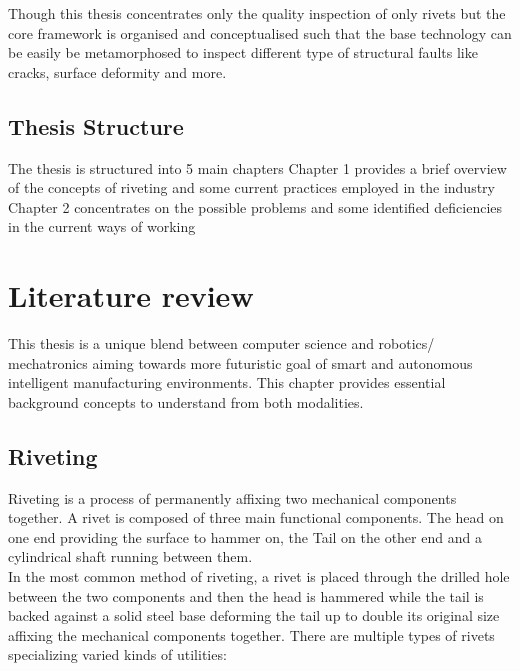 \documentclass{article}
\begin{document}
Though this thesis concentrates only the quality inspection of only rivets but the core framework is organised and conceptualised such that the base technology can be easily be metamorphosed to inspect different type of structural faults like cracks, surface deformity and more.

\subsection{Thesis Structure}

The thesis is structured into 5 main chapters   
Chapter 1 provides a brief overview of the concepts of riveting and some current practices employed in the industry
Chapter 2 concentrates on the possible problems and some identified deficiencies in the current ways of working 








 
\section{Literature review}

This thesis is a unique blend between computer science and robotics/ mechatronics aiming towards more futuristic goal of smart and autonomous intelligent manufacturing environments. This chapter provides essential background concepts to understand from both modalities.

\subsection{Riveting}

Riveting is a process of permanently affixing two mechanical components together. A rivet is composed of three main functional components. The head on one end providing the surface to hammer on, the Tail on the other end and a cylindrical shaft running between them.\cite{rivet} \\



In the most common method of riveting, a rivet is placed through the drilled hole between the two components and then the head is hammered while the tail is backed against a solid steel base deforming the tail up to double its original size affixing the mechanical components together.\newline
There are multiple types of rivets specializing varied kinds of utilities:\\
\end{document}
